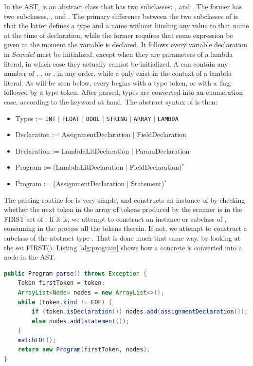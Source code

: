 In the AST,  is an abstract class that has two subclasses: , and . The former has two subclasses, , and . The primary difference between the two subclasses of  is that the latter defines a type and a name without binding any value to that name at the time of declaration, while the former requires that some expression be given at the moment the variable is declared. It follows every variable declaration in \emph{Scandal} must be initialized, except when they are parameters of a lambda literal, in which case they actually cannot be initialized. A  can contain any number of , , or , in any order, while a  only exist in the context of a lambda literal. As will be seen below, every  begins with a type token, or with a  flag, followed by a type token. After parsed, types are converted into an enumeration case, according to the keyword at hand. The abstract syntax of  is then:

\begin{itemize}
	\item Types := \texttt{INT} $|$ \texttt{FLOAT} $|$ \texttt{BOOL} $|$ \texttt{STRING} $|$ \texttt{ARRAY} $|$ \texttt{LAMBDA}
	\item Declaration := AssignmentDeclaration $|$ FieldDeclaration
	\item Declaration := LambdaLitDeclaration $|$ ParamDeclaration
	\item Program := (LambdaLitDeclaration $|$ FieldDeclaration)$^*$
	\item Program := (AssignmentDeclaration $|$ Statement)$^*$
\end{itemize}

The parsing routine for  is very simple, and constructs an instance of  by checking whether the next token in the array of tokens produced by the scanner is in the FIRST set of . If it is, we attempt to construct an instance or subclass of , consuming in the process all the tokens therein. If not, we attempt to construct a subclass of the abstract type . That is done much that same way, by looking at the set FIRST(). Listing \ref{alg:program} shows how a concrete  is converted into a  node in the AST.

\begin{lstlisting}[language=Java,caption={Parsing topmost-level constructs in \emph{Scandal}.},label={alg:program}]
public Program parse() throws Exception {
	Token firstToken = token;
	ArrayList<Node> nodes = new ArrayList<>();
	while (token.kind != EOF) {
		if (token.isDeclaration()) nodes.add(assignmentDeclaration());
		else nodes.add(statement());
	}
	matchEOF();
	return new Program(firstToken, nodes);
}
\end{lstlisting}

